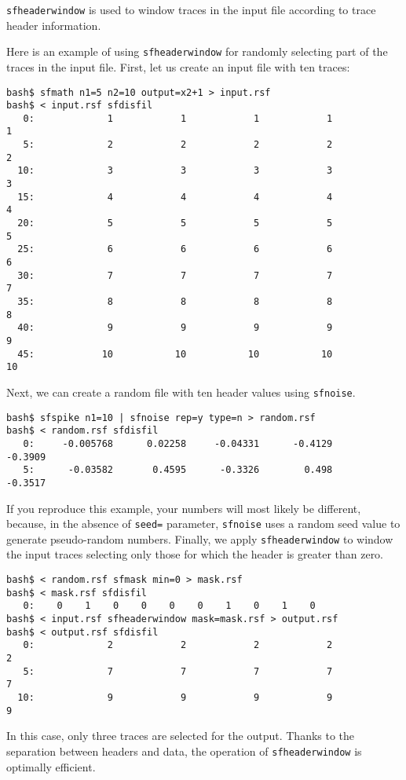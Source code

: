 \texttt{sfheaderwindow} is used to window traces in the input file
according to trace header information. 

Here is an example of using \texttt{sfheaderwindow} for randomly
selecting part of the traces in the input file. First, let us create
an input file with ten traces:
\begin{verbatim}
bash$ sfmath n1=5 n2=10 output=x2+1 > input.rsf
bash$ < input.rsf sfdisfil
   0:             1            1            1            1            1
   5:             2            2            2            2            2
  10:             3            3            3            3            3
  15:             4            4            4            4            4
  20:             5            5            5            5            5
  25:             6            6            6            6            6
  30:             7            7            7            7            7
  35:             8            8            8            8            8
  40:             9            9            9            9            9
  45:            10           10           10           10           10
\end{verbatim}
Next, we can create a random file with ten header values using
\texttt{sfnoise}.
\begin{verbatim}
bash$ sfspike n1=10 | sfnoise rep=y type=n > random.rsf
bash$ < random.rsf sfdisfil
   0:     -0.005768      0.02258     -0.04331      -0.4129      -0.3909
   5:      -0.03582       0.4595      -0.3326        0.498      -0.3517
\end{verbatim}
If you reproduce this example, your numbers will most likely be different,
because, in the absence of \texttt{seed=} parameter, \texttt{sfnoise}
uses a random seed value to generate pseudo-random numbers. Finally,
we apply \texttt{sfheaderwindow} to window the input traces selecting
only those for which the header is greater than zero.
\begin{verbatim}
bash$ < random.rsf sfmask min=0 > mask.rsf
bash$ < mask.rsf sfdisfil
   0:    0    1    0    0    0    0    1    0    1    0
bash$ < input.rsf sfheaderwindow mask=mask.rsf > output.rsf
bash$ < output.rsf sfdisfil
   0:             2            2            2            2            2
   5:             7            7            7            7            7
  10:             9            9            9            9            9
\end{verbatim}
In this case, only three traces are selected for the output. Thanks to
the separation between headers and data, the operation of
\texttt{sfheaderwindow} is optimally efficient. 

